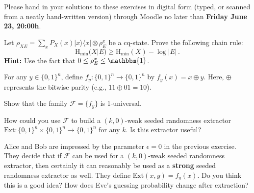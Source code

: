 \documentclass[a4paper,10pt,landscape,twocolumn]{scrartcl}
\newcommand{\ket}[1]{| #1 \rangle}
\newcommand{\bra}[1]{\langle #1 |}
\newcommand\deadline{Friday June 23, 20:00h}
\begin{document}
\newcommand{\Hmin}{\mathrm{H}_{\mathrm{min}}}

\homeworkproblems

{\sffamily\noindent
Please hand in your solutions to these exercises in digital form (typed, or scanned from a neatly hand-written version) through Moodle no later than \textbf{\deadline}.  %
}


\begin{exercise}
Let $\rho_{XE} = \sum_x P_X(x) \ket{x}\bra{x} \otimes \rho_E^x$ be a cq-state. Prove the following chain rule:
\[
\Hmin(X | E) \geq \Hmin(X) - \log |E| \, .
\]
\textbf{Hint: } Use the fact that $0 \leq \rho_E^x \leq \mathbbm{1}$.

\end{exercise}

\begin{exercise}
	For any $y \in \{0,1\}^n$, define $f_y : \{0,1\}^n \to \{0,1\}^n$ by $f_y(x) = x \oplus y$. Here, $\oplus$ represents the bitwise parity (e.g., $11 \oplus 01 = 10$).
	\begin{subex}
		Show that the family $\mathscr{F} = \{f_y\}$ is 1-universal.
	\end{subex}
    \begin{subex}
    	How could you use $\mathscr{F}$ to build a $(k,0)$-weak seeded randomness extractor $\text{Ext} : \{0,1\}^n \times \{0,1\}^n \to \{0,1\}^n$ for any $k$. Is this extractor useful?
    \end{subex}
    \begin{subex}
    	Alice and Bob are impressed by the parameter $\epsilon = 0$ in the previous exercise. They decide that if $\mathscr{F}$ can be used for a $(k,0)$-weak seeded randomness extractor, then certainly it can reasonably be used as a \textbf{strong} seeded randomness extractor as well. They define $\text{Ext}(x,y) = f_y(x)$. Do you think this is a good idea? How does Eve's guessing probability change after extraction?
    \end{subex}
\end{exercise}
\end{document}
